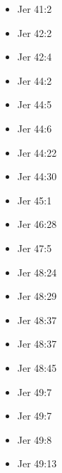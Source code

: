 \documentclass[14pt]{article}
\begin{document}
\begin{multicols}{2}
\begin{itemize}
								\item Jer 41:2
								
								\item Jer 42:2
								
								\item Jer 42:4
								
								\item Jer 44:2
								
								\item Jer 44:5
								
								\item Jer 44:6
								
								\item Jer 44:22
								
								\item Jer 44:30
								
								\item Jer 45:1
								
								\item Jer 46:28
								
								\item Jer 47:5
								
								\item Jer 48:24
								
								\item Jer 48:29
								
								\item Jer 48:37
								
								\item Jer 48:37
								
								\item Jer 48:45
								
								\item Jer 49:7
								
								\item Jer 49:7
								
								\item Jer 49:8
								
								\item Jer 49:13
								

\end{itemize}
\end{multicols}
\end{document}
